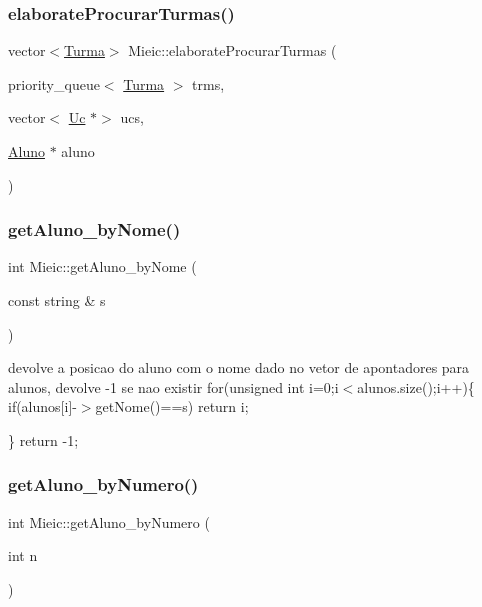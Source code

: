 \subsubsection{\texorpdfstring{elaborate\+Procurar\+Turmas()}{elaborateProcurarTurmas()}}
{\footnotesize\ttfamily vector$<$\hyperlink{class_turma}{Turma}$>$ Mieic\+::elaborate\+Procurar\+Turmas (\begin{DoxyParamCaption}\item[{priority\+\_\+queue$<$ \hyperlink{class_turma}{Turma} $>$}]{trms,  }\item[{vector$<$ \hyperlink{class_uc}{Uc} $\ast$$>$}]{ucs,  }\item[{\hyperlink{class_aluno}{Aluno} $\ast$}]{aluno }\end{DoxyParamCaption})}

\hypertarget{class_mieic_a6c7736575c7cd99d0f8e246bdb50f6fd}{}\label{class_mieic_a6c7736575c7cd99d0f8e246bdb50f6fd} 
\subsubsection{\texorpdfstring{get\+Aluno\+\_\+by\+Nome()}{getAluno\_byNome()}}
{\footnotesize\ttfamily int Mieic\+::get\+Aluno\+\_\+by\+Nome (\begin{DoxyParamCaption}\item[{const string \&}]{s }\end{DoxyParamCaption})}

devolve a posicao do aluno com o nome dado no vetor de apontadores para alunos, devolve -\/1 se nao existir for(unsigned int i=0;i$<$alunos.\+size();i++)\{ if(alunos\mbox{[}i\mbox{]}-\/$>$get\+Nome()==s) return i;

\} return -\/1;\hypertarget{class_mieic_a65225667ff9248371e57f511a62d9f23}{}\label{class_mieic_a65225667ff9248371e57f511a62d9f23} 
\subsubsection{\texorpdfstring{get\+Aluno\+\_\+by\+Numero()}{getAluno\_byNumero()}}
{\footnotesize\ttfamily int Mieic\+::get\+Aluno\+\_\+by\+Numero (\begin{DoxyParamCaption}\item[{int}]{n }\end{DoxyParamCaption})}

